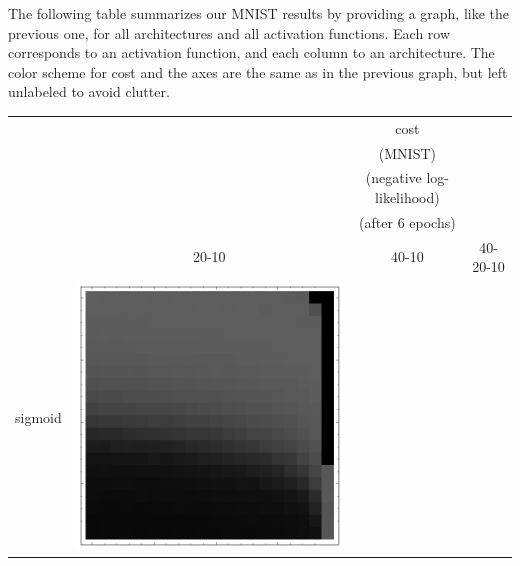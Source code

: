 \documentclass[10pt]{article}
\begin{document}
The following table summarizes our MNIST results by providing a graph,
like the previous one, for all architectures and all activation 
functions. Each row corresponds to an activation function, and each
column to an architecture. The color scheme for cost and the axes are
the same as in the previous graph, but left unlabeled to avoid
clutter.

\begin{tabular}{|c|c|c|c|}
        \hline
        & & {\LARGE cost} & \\
        & & (MNIST) & \\
        & & (negative log-likelihood) & \\
        & & (after 6 epochs) & \\
        \hline
         & 20-10 & 40-10 & 40-20-10\\ \hline
sigmoid 
        & \includegraphics[scale=0.25]{plots/simple/LF-20S10S-20T10-MNIST-6.png}

\end{tabular}
\end{document}
